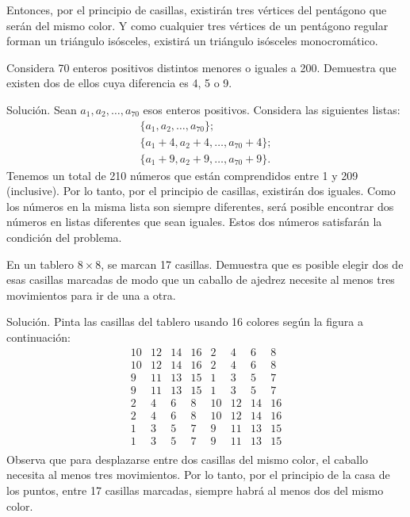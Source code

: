 \documentclass[11pt]{scrartcl}
\begin{document}
Entonces, por el principio de casillas, existirán tres vértices del pentágono que serán del mismo color. Y como cualquier tres vértices de un pentágono regular forman un triángulo isósceles, existirá un triángulo isósceles monocromático.

\begin{example}[Leningrado]
    Considera 70 enteros positivos distintos menores o iguales a 200. Demuestra que existen dos de ellos cuya diferencia es 4, 5 o 9.
\end{example}
Solución. Sean \(a_1, a_2, \ldots, a_{70}\) esos enteros positivos. Considera las siguientes listas:
\begin{align*}
\{a_1, a_2, \ldots, a_{70}\}; \\
\{a_1 + 4, a_2 + 4, \ldots, a_{70} + 4\}; \\
\{a_1 + 9, a_2 + 9, \ldots, a_{70} + 9\}.
\end{align*}
Tenemos un total de 210 números que están comprendidos entre 1 y 209 (inclusive). Por lo tanto, por el principio de casillas, existirán dos iguales. Como los números en la misma lista son siempre diferentes, será posible encontrar dos números en listas diferentes que sean iguales. Estos dos números satisfarán la condición del problema.

\begin{example}
    En un tablero \(8 \times 8\), se marcan 17 casillas. Demuestra que es posible elegir dos de esas casillas marcadas de modo que un caballo de ajedrez necesite al menos tres movimientos para ir de una a otra.
\end{example}
Solución. Pinta las casillas del tablero usando 16 colores según la figura a continuación:
\[
\begin{matrix}
10 & 12 & 14 & 16 & 2 & 4 & 6 & 8 \\
10 & 12 & 14 & 16 & 2 & 4 & 6 & 8 \\
9 & 11 & 13 & 15 & 1 & 3 & 5 & 7 \\
9 & 11 & 13 & 15 & 1 & 3 & 5 & 7 \\
2 & 4 & 6 & 8 & 10 & 12 & 14 & 16 \\
2 & 4 & 6 & 8 & 10 & 12 & 14 & 16 \\
1 & 3 & 5 & 7 & 9 & 11 & 13 & 15 \\
1 & 3 & 5 & 7 & 9 & 11 & 13 & 15 \\
\end{matrix}
\]
Observa que para desplazarse entre dos casillas del mismo color, el caballo necesita al menos tres movimientos. Por lo tanto, por el principio de la casa de los puntos, entre 17 casillas marcadas, siempre habrá al menos dos del mismo color.
\end{document}
